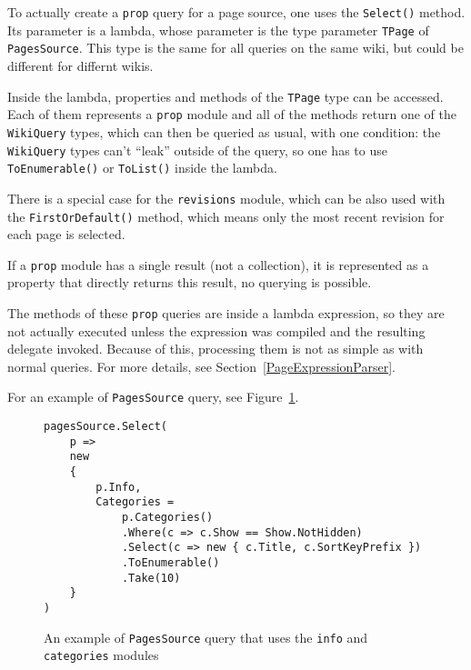 \medskip

To actually create a \texttt{prop} query for a page source, one uses the \lstinline{Select()} method.
Its parameter is a lambda, whose parameter is the type parameter \lstinline{TPage} of \lstinline{PagesSource}.
This type is the same for all queries on the same wiki, but could be different for differnt wikis.

Inside the lambda, properties and methods of the \lstinline{TPage} type can be accessed.
Each of them represents a \texttt{prop} module and all of the methods return one of the \lstinline{WikiQuery} types,
which can then be queried as usual, with one condition:
the \lstinline{WikiQuery} types can't ``leak'' outside of the query, so one has to use \lstinline{ToEnumerable()} or \lstinline{ToList()} inside the lambda.

There is a special case for the \texttt{revisions} module,
which can be also used with the \lstinline{FirstOrDefault()} method,
which means only the most recent revision for each page is selected.

If a \texttt{prop} module has a single result (not a collection), it is represented as a property
that directly returns this result, no querying is possible.

\medskip

The methods of these \texttt{prop} queries are inside a lambda expression,
so they are not actually executed unless the expression was compiled and the resulting delegate invoked.
Because of this, processing them is not as simple as with normal queries.
For more details, see Section~\ref{PageExpressionParser}.

\medskip

For an example of \lstinline{PagesSource} query, see Figure~\ref{PS query}.

\begin{figure}[htbp]

\begin{lstlisting}
pagesSource.Select(
    p =>
    new
    {
        p.Info,
        Categories =
            p.Categories()
            .Where(c => c.Show == Show.NotHidden)
            .Select(c => new { c.Title, c.SortKeyPrefix })
            .ToEnumerable()
            .Take(10)
	}
)
\end{lstlisting}

\caption{An example of  \lstinline{PagesSource} query that uses the \texttt{info} and \texttt{categories} modules}
\label{PS query}

\end{figure}

